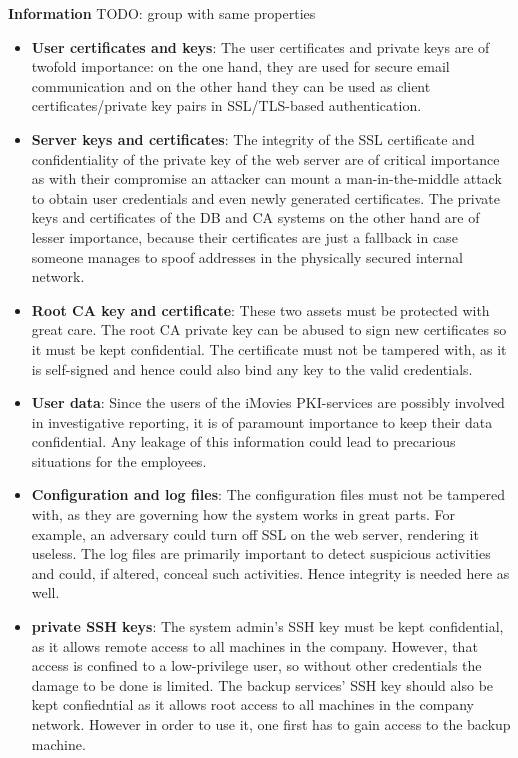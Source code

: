 \documentclass[english]{article}
\begin{document}
\noindent\textbf{Information}
TODO: group with same properties
\begin{itemize}
\item \textbf{User certificates and keys}: The user certificates and private keys are of twofold importance: on the one hand, they are used for secure email communication and on the other hand they can be used as client certificates/private key pairs
in SSL/TLS-based authentication. 
\item \textbf{Server keys and certificates}: The integrity of the SSL certificate and confidentiality of the private key of the web server are of critical importance as with their compromise an attacker can mount a man-in-the-middle attack to obtain user credentials and
even newly generated certificates. The private keys and certificates of the DB and CA systems on the other hand are of lesser importance, because their certificates are just a fallback in case someone manages to spoof addresses in the 
physically secured internal network.
\item \textbf{Root CA key and certificate}: These two assets must be protected with great care. The root CA private key can be abused to sign new certificates so it must be kept confidential. The certificate must not be tampered with,
as it is self-signed and hence could also bind any key to the valid credentials.
\item \textbf{User data}: Since the users of the iMovies PKI-services are possibly involved in investigative reporting, it is of paramount importance to keep their data confidential. Any leakage of this information could
lead to precarious situations for the employees.
\item \textbf{Configuration and log files}: The configuration files must not be tampered with, as they are governing how the system works in great parts. For example, an adversary could turn off SSL on the web server, rendering it useless.
The log files are primarily important to detect suspicious activities and could, if altered, conceal such activities. Hence integrity is needed here as well.
\item \textbf{private SSH keys}: The system admin's SSH key must be kept confidential, as it allows remote access to all machines in the company. However, that access is confined to a low-privilege user, so without other credentials the damage
to be done is limited. The backup services' SSH key should also be kept confiedntial as it allows root access to all machines in the company network. However in order to use it, one first has to gain access to the backup machine.

\end{itemize}
\end{document}
